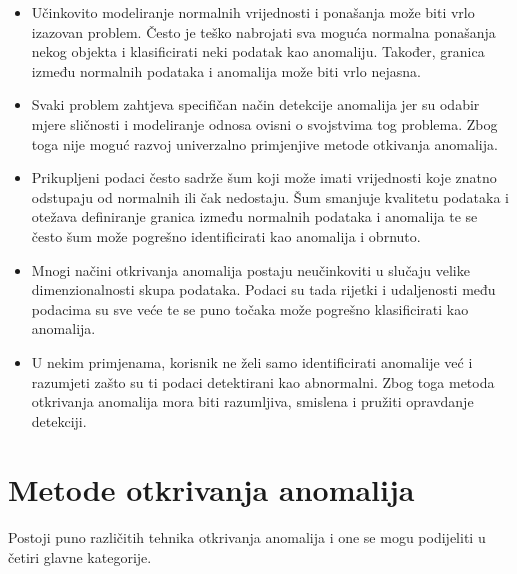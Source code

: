 \documentclass[utf8, diplomski, numeric]{fer}
\begin{document}
\begin{itemize}
\item Učinkovito modeliranje normalnih vrijednosti i ponašanja može biti vrlo izazovan problem. Često je teško nabrojati sva moguća normalna ponašanja nekog objekta i klasificirati neki podatak kao anomaliju. Također, granica  između normalnih podataka i anomalija može biti vrlo nejasna.
\item Svaki problem zahtjeva specifičan način detekcije anomalija jer su odabir mjere sličnosti i modeliranje odnosa ovisni o svojstvima tog problema. Zbog toga nije moguć razvoj univerzalno primjenjive metode otkivanja anomalija.
\item Prikupljeni podaci često sadrže šum koji može imati vrijednosti koje znatno odstupaju od normalnih ili čak nedostaju. Šum smanjuje kvalitetu podataka i otežava definiranje granica između normalnih podataka i anomalija te se često šum može pogrešno identificirati kao anomalija i obrnuto.
\item Mnogi načini otkrivanja anomalija postaju neučinkoviti u slučaju velike dimenzionalnosti skupa podataka. Podaci su tada rijetki i udaljenosti među podacima su sve veće te se puno točaka može pogrešno klasificirati kao anomalija.
\item U nekim primjenama, korisnik ne želi samo identificirati anomalije već i razumjeti zašto su ti podaci detektirani kao abnormalni. Zbog toga metoda otkrivanja anomalija mora biti razumljiva, smislena i pružiti opravdanje detekciji.
\end{itemize}


\section{Metode otkrivanja anomalija}
Postoji puno različitih tehnika otkrivanja anomalija i one se mogu podijeliti u četiri glavne kategorije.
\end{document}
